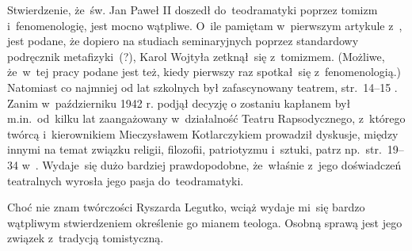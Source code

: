 \documentclass[a4paper,11pt]{article}
\begin{document}
\newpage


\vspace{0em}



\vspace{0em}


\noindent
{} Stwierdzenie, że~św. Jan Paweł II doszedł do~teodramatyki poprzez
tomizm i~fenomenologię, jest mocno wątpliwe. O~ile pamiętam w~pierwszym
artykule z~\cite{PoslugaMysleniaVolIX2011}, jest podane, że dopiero na
studiach seminaryjnych poprzez standardowy podręcznik metafizyki~(?), Karol
Wojtyła zetknął~się z~tomizmem. (Możliwe, że~w~tej pracy podane jest też,
kiedy pierwszy raz spotkał~się z~fenomenologią.) Natomiast co najmniej od
lat szkolnych był zafascynowany teatrem, str.~14--15
\cite{NowakJanPawelIIKronikaZyciaIPontyfikatu2015}. Zanim w~październiku
1942 r. podjął decyzję o zostaniu kapłanem był m.in.~od~kilku lat
zaangażowany w~działalność Teatru Rapsodycznego, z~którego twórcą
i~kierownikiem Mieczysławem Kotlarczykiem prowadził dyskusje, między innymi
na temat związku religii, filozofii, patriotyzmu i~sztuki, patrz
np.~str.~19--34 w~\cite{NowakJanPawelIIKronikaZyciaIPontyfikatu2015}.
Wydaje~się dużo bardziej prawdopodobne, że~właśnie z~jego doświadczeń
teatralnych wyrosła jego pasja do~teodramatyki.

\vspace{\spaceFour}





\noindent
{} Choć nie znam twórczości Ryszarda Legutko, wciąż
wydaje mi~się bardzo wątpliwym stwierdzeniem określenie go mianem
teologa. Osobną sprawą jest jego związek z~tradycją tomistyczną.






\end{document}
